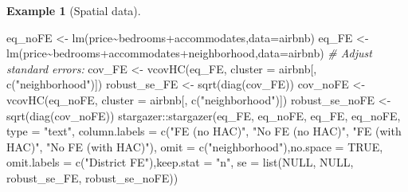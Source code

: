 \documentclass[
  12pt,
]{book}
\newenvironment{Shaded}{\begin{snugshade}}{\end{snugshade}}
\newcommand{\AttributeTok}[1]{\textcolor[rgb]{0.77,0.63,0.00}{#1}}
\newcommand{\CommentTok}[1]{\textcolor[rgb]{0.56,0.35,0.01}{\textit{#1}}}
\newcommand{\ConstantTok}[1]{\textcolor[rgb]{0.00,0.00,0.00}{#1}}
\newcommand{\FunctionTok}[1]{\textcolor[rgb]{0.00,0.00,0.00}{#1}}
\newcommand{\NormalTok}[1]{#1}
\newcommand{\OtherTok}[1]{\textcolor[rgb]{0.56,0.35,0.01}{#1}}
\newcommand{\SpecialCharTok}[1]{\textcolor[rgb]{0.00,0.00,0.00}{#1}}
\newcommand{\StringTok}[1]{\textcolor[rgb]{0.31,0.60,0.02}{#1}}
\theoremstyle{definition}
\theoremstyle{definition}
\newtheorem{example}{Example}[chapter]
\theoremstyle{definition}
\theoremstyle{definition}
\theoremstyle{remark}
\begin{document}
\begin{example}[Spatial data]
\begin{Shaded}
\begin{Highlighting}[]
\NormalTok{eq\_noFE }\OtherTok{\textless{}{-}} \FunctionTok{lm}\NormalTok{(price}\SpecialCharTok{\textasciitilde{}}\NormalTok{bedrooms}\SpecialCharTok{+}\NormalTok{accommodates,}\AttributeTok{data=}\NormalTok{airbnb)}
\NormalTok{eq\_FE   }\OtherTok{\textless{}{-}} \FunctionTok{lm}\NormalTok{(price}\SpecialCharTok{\textasciitilde{}}\NormalTok{bedrooms}\SpecialCharTok{+}\NormalTok{accommodates}\SpecialCharTok{+}\NormalTok{neighborhood,}\AttributeTok{data=}\NormalTok{airbnb)}
\CommentTok{\# Adjust standard errors:}
\NormalTok{cov\_FE          }\OtherTok{\textless{}{-}} \FunctionTok{vcovHC}\NormalTok{(eq\_FE, }\AttributeTok{cluster =}\NormalTok{ airbnb[, }\FunctionTok{c}\NormalTok{(}\StringTok{"neighborhood"}\NormalTok{)])}
\NormalTok{robust\_se\_FE    }\OtherTok{\textless{}{-}} \FunctionTok{sqrt}\NormalTok{(}\FunctionTok{diag}\NormalTok{(cov\_FE))}
\NormalTok{cov\_noFE        }\OtherTok{\textless{}{-}} \FunctionTok{vcovHC}\NormalTok{(eq\_noFE, }\AttributeTok{cluster =}\NormalTok{ airbnb[, }\FunctionTok{c}\NormalTok{(}\StringTok{"neighborhood"}\NormalTok{)])}
\NormalTok{robust\_se\_noFE  }\OtherTok{\textless{}{-}} \FunctionTok{sqrt}\NormalTok{(}\FunctionTok{diag}\NormalTok{(cov\_noFE))}
\NormalTok{stargazer}\SpecialCharTok{::}\FunctionTok{stargazer}\NormalTok{(eq\_FE, eq\_noFE, eq\_FE, eq\_noFE, }\AttributeTok{type =} \StringTok{"text"}\NormalTok{,}
                     \AttributeTok{column.labels =} \FunctionTok{c}\NormalTok{(}\StringTok{"FE (no HAC)"}\NormalTok{, }\StringTok{"No FE (no HAC)"}\NormalTok{,}
                                       \StringTok{"FE (with HAC)"}\NormalTok{, }\StringTok{"No FE (with HAC)"}\NormalTok{),}
                     \AttributeTok{omit =} \FunctionTok{c}\NormalTok{(}\StringTok{"neighborhood"}\NormalTok{),}\AttributeTok{no.space =} \ConstantTok{TRUE}\NormalTok{,}
                     \AttributeTok{omit.labels =} \FunctionTok{c}\NormalTok{(}\StringTok{"District FE"}\NormalTok{),}\AttributeTok{keep.stat =} \StringTok{"n"}\NormalTok{,}
                     \AttributeTok{se =} \FunctionTok{list}\NormalTok{(}\ConstantTok{NULL}\NormalTok{, }\ConstantTok{NULL}\NormalTok{, robust\_se\_FE, robust\_se\_noFE))}
\end{Highlighting}
\end{Shaded}


\end{example}
\end{document}
